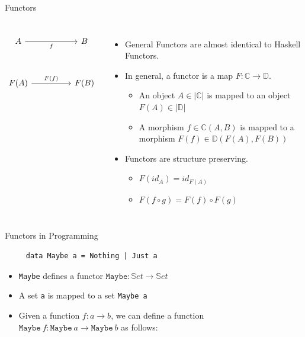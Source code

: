\documentclass[aspectratio=169]{beamer} %
\newcommand{\bC}{\mathbb{C}}
\newcommand{\bD}{\mathbb{D}}
\begin{document}
{\begin{frame}[fragile]{Functors}
\begin{columns}
\[\begin{tikzcd}
	A && B \\
	\\
	{F(A)} && {F(B)}
	\arrow["f"', from=1-1, to=1-3]
	\arrow["{F(f)}", from=3-1, to=3-3]
\end{tikzcd}\]
\begin{itemize}
 \item General Functors are almost identical to Haskell Functors.
 \pause\item In general, a functor is a map $F : \bC \to \bD$.
 \begin{itemize}
  \pause\item An object $A \in |\bC|$ is mapped to an object $F(A) \in |\bD|$
  \pause\item A morphism $f \in \bC(A,B)$ is mapped to a morphism $F(f) \in \bD(F(A), F(B))$
 \end{itemize}
 \pause\item Functors are structure preserving.
 \begin{itemize}
  \pause\item $F(id_A) = id_{F(A)}$
  \pause\item $F(f \circ g) = F(f) \circ F(g)$
 \end{itemize}
\end{itemize}
\end{columns}
\end{frame}
\begin{frame}[fragile]{Functors in Programming}
 \begin{verbatim}
     data Maybe a = Nothing | Just a
 \end{verbatim}
 \begin{itemize}
  \item \texttt{Maybe} defines a functor $\texttt{Maybe} : \mathbb{S}et \to \mathbb{S}et$
  \item A set \texttt{a} is mapped to a set \texttt{Maybe a}
  \item Given a function $f : a \to b$, we can define a function $\texttt{Maybe}\ f : \texttt{Maybe}\ a \to \texttt{Maybe}\ b$  as follows:
  \begin{align*}

\end{align*}
\end{itemize}
\end{frame}}
\end{document}

